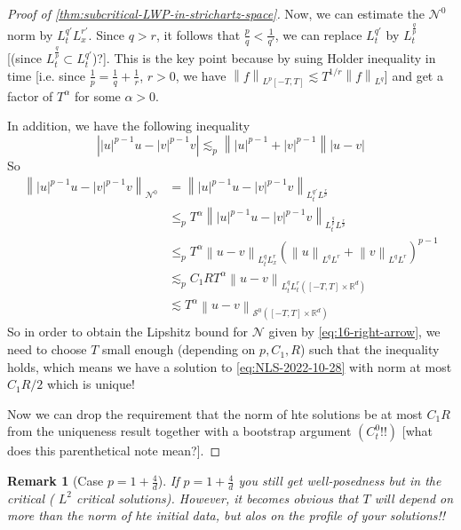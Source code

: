 \documentclass{article}
\def\purple{\color{Purple}}
\newcommand{\pnote}[1]{{\purple [#1]}} %
\newtheorem{remark}{Remark}
\def\R{\mathbb{R}} %
\newcommand\norm[1]{\left\lVert#1\right\rVert}
\begin{document}
\begin{proof}[Proof of \cref{thm:subcritical-LWP-in-strichartz-space}]
  Now, we can estimate the $\mathcal{N}^{0}$ norm by $L_{t}^{q'}L_{x}^{r'}$.
  Since $q>r$, it follows that $\frac{p}{q}<\frac{1}{q'}$, we can replace
  $L_{t}^{q'}$ by $L^{\frac{q}{p}}_{t}$ \pnote{(since
    $L^{\frac{q}{p}}_{t}\subset L^{q'}_{t}$)?}. This is the key point because by
  suing Holder inequality in time [i.e. since
  $\frac{1}{p}=\frac{1}{q}+\frac{1}{r}$, $r>0$, we have
  $\norm{f}_{L^{p}[-T,T]}\lesssim T^{1/r} \norm{f}_{L^{q}}$] and get a factor of
  $T^{\alpha}$ for some $\alpha>0$.

  In addition, we have the following inequality
  \begin{equation*}
    \left| |u|^{p-1}u-|v|^{p-1}v \right| 
    \lesssim _{p} \norm{|u|^{p-1}+ |v|^{p-1}} \left| u-v \right|
  \end{equation*}
  So
  \begin{align*}
    \norm{|u|^{p-1}u-|v|^{p-1}v}_{\mathcal{N}^{0}} 
    &= \norm{|u|^{p-1}u - |v|^{p-1}v}_{L^{q'}_{t}L^{\frac{r}{p}}} \\
    &\leq _{p} T^{\alpha} \norm{|u|^{p-1}u-|v|^{p-1}v}_{L_{t}^{\frac{q}{p}}L^{\frac{r}{p}}} \\
    &\leq _{p} T^{\alpha} \norm{u-v}_{L_{t}^{q}L_{x}^{r}}\left( \norm{u}_{L^{q}L^{r}}+\norm{v}_{L^{q}L^{r}} \right)^{p-1} \\
    &\lesssim _{p}C_{1}R T^{\alpha}\norm{u-v}_{L_{t}^{q}L_{t}^{r}\left( \left[ -T,T \right]\times \R^d  \right) } \\
    &\lesssim T^{\alpha} \norm{u-v}_{\mathcal{S}^{0}\left( [-T,T]\times \R^d  \right) }
  \end{align*}
  So in order to obtain the Lipshitz bound for $\mathcal{N}$ given by
  \cref{eq:16-right-arrow}, we need to choose $T$ small enough (depending on
  $p,C_{1},R$) such that the inequality holds, which means we have a solution to
  \cref{eq:NLS-2022-10-28} with norm at most $C_{1}R/2$ which is unique!

  Now we can drop the requirement that the norm of hte solutions be at most
  $C_{1}R$ from the uniqueness result together with a bootstrap argument
  $(C_{t}^{0}!!)$ \pnote{what does this parenthetical note mean?}. 
\end{proof}
\begin{remark}[Case $p=1+\frac{4}{d}$]
  If $p=1+\frac{4}{d}$ you still get well-posedness but in the critical (
  $L^{2}$ critical solutions). However, it becomes obvious that $T$ will depend
  on more than the norm of hte initial data, but alos on the profile of your
  solutions!! 
\end{remark}
\end{document}

